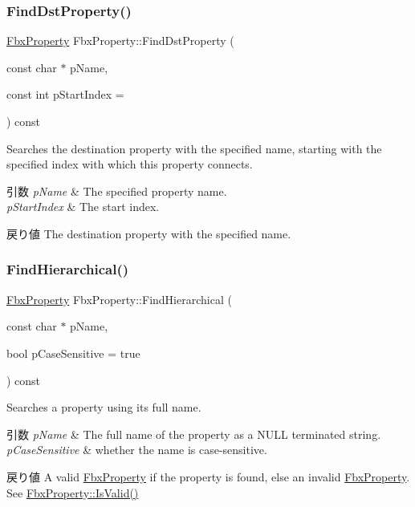 \subsubsection{\texorpdfstring{Find\+Dst\+Property()}{FindDstProperty()}}
{\footnotesize\ttfamily \hyperlink{class_fbx_property}{Fbx\+Property} Fbx\+Property\+::\+Find\+Dst\+Property (\begin{DoxyParamCaption}\item[{const char $\ast$}]{p\+Name,  }\item[{const int}]{p\+Start\+Index = {} }\end{DoxyParamCaption}) const}

Searches the destination property with the specified name, starting with the specified index with which this property connects. 
\begin{DoxyParams}{引数}
{\em p\+Name} & The specified property name. \\
\hline
{\em p\+Start\+Index} & The start index. \\
\hline
\end{DoxyParams}
\begin{DoxyReturn}{戻り値}
The destination property with the specified name. 
\end{DoxyReturn}
\mbox{\label{class_fbx_property_aa3c6cdd5991e086121dc7d724846e444}} 
\subsubsection{\texorpdfstring{Find\+Hierarchical()}{FindHierarchical()}\hspace{0.1cm}{\footnotesize\ttfamily [1/2]}}
{\footnotesize\ttfamily \hyperlink{class_fbx_property}{Fbx\+Property} Fbx\+Property\+::\+Find\+Hierarchical (\begin{DoxyParamCaption}\item[{const char $\ast$}]{p\+Name,  }\item[{bool}]{p\+Case\+Sensitive = {\ttfamily true} }\end{DoxyParamCaption}) const\hspace{0.3cm}{\ttfamily [inline]}}

Searches a property using its full name. 
\begin{DoxyParams}{引数}
{\em p\+Name} & The full name of the property as a {\ttfamily N\+U\+LL} terminated string. \\
\hline
{\em p\+Case\+Sensitive} & whether the name is case-\/sensitive. \\
\hline
\end{DoxyParams}
\begin{DoxyReturn}{戻り値}
A valid \hyperlink{class_fbx_property}{Fbx\+Property} if the property is found, else an invalid \hyperlink{class_fbx_property}{Fbx\+Property}. See \hyperlink{class_fbx_property_a1c40042c55d1f4a1d4837f06fbc1d764}{Fbx\+Property\+::\+Is\+Valid()} 
\end{DoxyReturn}


